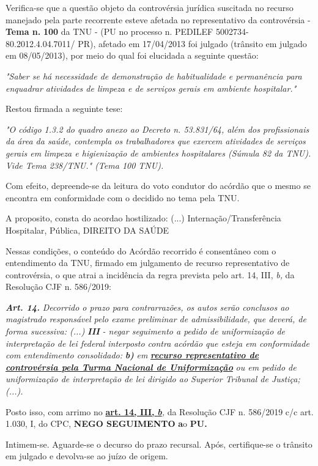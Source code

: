 \documentclass[12pt]{article}
\begin{document}
\justifying
\noindent Verifica-se que a questão objeto da controvérsia jurídica suscitada no recurso manejado pela parte recorrente esteve afetada no representativo da controvérsia - \textbf{Tema n. }\textbf{100} da TNU - (PU no processo n. PEDILEF 5002734-80.2012.4.04.7011/ PR),  afetado em 17/04/2013 foi julgado (trânsito em julgado em 08/05/2013), por meio do qual foi elucidada a seguinte questão:

\noindent \textit{"Saber se há necessidade de demonstração de habitualidade e permanência para enquadrar atividades de limpeza e de serviços gerais em ambiente hospitalar."}

\noindent Restou firmada a seguinte tese:

\noindent \textit{"O código 1.3.2 do quadro anexo ao Decreto n. 53.831/64, além dos profissionais da área da saúde, contempla os trabalhadores que exercem atividades de serviços gerais em limpeza e higienização de ambientes hospitalares (Súmula 82 da TNU). Vide Tema 238/TNU." (Tema 100 TNU).}

\noindent Com efeito, depreende-se da leitura do voto condutor do acórdão que o mesmo se encontra em conformidade com o decidido no  tema pela TNU.

\noindent A proposito, consta do acordao hostilizado: (...) Internação/Transferência Hospitalar, Pública, DIREITO DA SAÚDE

\noindent Nessas condições, o conteúdo do Acórdão recorrido é consentâneo com o entendimento da TNU, firmado em julgamento de recurso representativo de controvérsia, o que atrai a incidência da regra prevista pelo art. 14, III, \textit{b,} da Resolução CJF n. 586/2019:

\noindent \textit{\textbf{Art. 14.}}\textit{ Decorrido o prazo para contrarrazões, os autos serão conclusos ao magistrado responsável pelo exame preliminar de admissibilidade, que deverá, de forma sucessiva: (...) }\textit{\textbf{III }}\textit{- negar seguimento a pedido de uniformização de interpretação de lei federal interposto contra acórdão que esteja em conformidade com entendimento consolidado: }\textit{\textbf{b)}}\textit{ em }\uline{\textit{\textbf{recurso representativo de controvérsia pela Turma Nacional de Uniformização}}}\textit{ ou em pedido de uniformização de interpretação de lei dirigido ao Superior Tribunal de Justiça;(...).}

\noindent Posto isso, com arrimo no \uline{\textbf{art. 14, III, }}\uline{\textit{\textbf{b}}}\textit{,} da Resolução CJF n. 586/2019 c/c art. 1.030, I, do CPC, \textbf{NEGO SEGUIMENTO }\textbf{a}o\textbf{ PU}\textbf{.}

\noindent Intimem-se. Aguarde-se o decurso do prazo recursal. Após, certifique-se o trânsito em julgado e devolva-se ao juízo de origem.
\end{document}
